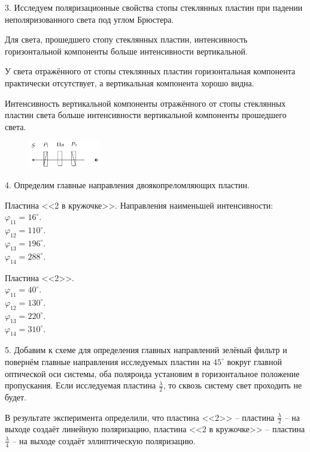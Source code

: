 3. Исследуем поляризационные свойства стопы стеклянных пластин при падении неполяризованного света под углом Брюстера.

Для света, прошедшего стопу стеклянных пластин, интенсивность горизонтальной компоненты больше интенсивности вертикальной.

У света отражённого от стопы стеклянных пластин горизонтальная компонента практически отсутствует, а вертикальная компонента хорошо видна.

Интенсивность вертикальной компоненты отражённого от стопы стеклянных пластин света больше интенсивности вертикальной компоненты прошедшего света.

\begin{figure}
	\centering
	\includegraphics[width=0.28\textwidth]{../Изображения/main directions.png}
\end{figure}

4. Определим главные направления двоякопреломляющих пластин.

Пластина <<2 в кружочке>>. Направления наименьшей интенсивности: \\
$\varphi_{11} = 16^\circ$. \\
$\varphi_{12} = 110^\circ$. \\
$\varphi_{13} = 196^\circ$. \\
$\varphi_{14} = 288^\circ$.

Пластина <<2>>. \\
$\varphi_{11} = 40^\circ$. \\
$\varphi_{12} = 130^\circ$. \\
$\varphi_{13} = 220^\circ$. \\
$\varphi_{14} = 310^\circ$.

5. Добавим к схеме для определения главных направлений зелёный фильтр и повернём главные направления исследуемых пластин на $45^\circ$ вокруг главной оптической оси системы, оба поляроида установим в горизонтальное положение пропускания. Если исследуемая пластина $\frac{\lambda}{2}$, то сквозь систему свет проходить не будет.

В результате эксперимента определили, что пластина <<2>> -- пластина $\frac{\lambda}{2}$ -- на выходе создаёт линейную поляризацию, пластина <<2 в кружочке>> -- пластина $\frac{\lambda}{4}$ -- на выходе создаёт эллиптическую поляризацию.

